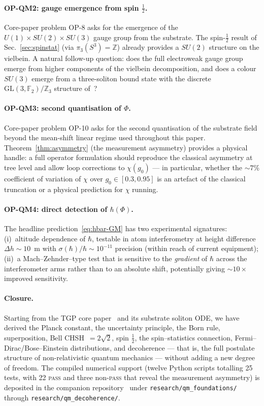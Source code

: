 \documentclass[11pt,a4paper]{article}
\renewcommand{\Phi}{\varPhi}
\newcommand{\chiTGP}{\chi}
\newcommand{\pithreeS}{\pi_{3}(S^{3})}
\begin{document}
\paragraph{OP-QM2: gauge emergence from spin $\tfrac{1}{2}$.}
Core-paper problem OP-8 asks for the emergence of the
$U(1)\times SU(2)\times SU(3)$ gauge group from the substrate. The
spin-$\tfrac{1}{2}$ result of Sec.~\ref{sec:spinstat} (via
$\pithreeS=\mathbb{Z}$) already provides a $SU(2)$ structure on the
vielbein. A natural follow-up question: does the full
electroweak gauge group emerge from higher components of the
vielbein decomposition, and does a colour $SU(3)$ emerge from a
three-soliton bound state with the discrete
$\mathrm{GL}(3,\mathbb{F}_{2})/\mathbb{Z}_{3}$ structure
of~\cite{TGP-leptons}?

\paragraph{OP-QM3: second quantisation of $\Phi$.}
Core-paper problem OP-10 asks for the second quantisation of the
substrate field beyond the mean-shift linear regime used throughout
this paper. Theorem~\ref{thm:asymmetry} (the measurement asymmetry)
provides a physical handle: a full operator formulation should
reproduce the classical asymmetry at tree level and allow loop
corrections to $\chiTGP(g_{0})$ --- in particular, whether the
$\sim 7\%$ coefficient of variation of $\chiTGP$ over
$g_{0}\in[0.3,0.95]$ is an artefact of the classical truncation or
a physical prediction for $\chiTGP$ running.

\paragraph{OP-QM4: direct detection of $\hbar(\Phi)$.}
The headline prediction~\eqref{eq:hbar-GM} has two experimental
signatures: (i)~altitude dependence of $\hbar$, testable in
atom interferometry at height difference $\Delta h\sim 10$~m with
$\sigma(\hbar)/\hbar\sim 10^{-11}$ precision
(within reach of current equipment); (ii)~a Mach--Zehnder--type
test that is sensitive to the \emph{gradient} of $\hbar$ across the
interferometer arms rather than to an absolute shift, potentially
giving $\sim 10\times$ improved sensitivity.

\paragraph{Closure.}
Starting from the TGP core paper~\cite{TGP-core} and its substrate
soliton ODE, we have derived the Planck constant, the
uncertainty principle, the Born rule, superposition, Bell
CHSH~$=2\sqrt{2}$, spin $\tfrac{1}{2}$, the spin--statistics
connection, Fermi--Dirac/Bose--Einstein distributions, and
decoherence --- that is, the full postulate structure of non-relativistic
quantum mechanics --- without adding a new degree of freedom. The
compiled numerical support (twelve Python scripts totalling 25
tests, with 22 \textsc{pass} and three non-\textsc{pass} that
reveal the measurement asymmetry) is deposited in the companion
repository~\cite{TGP-repo} under \verb|research/qm_foundations/|
through \verb|research/qm_decoherence/|.
\end{document}
